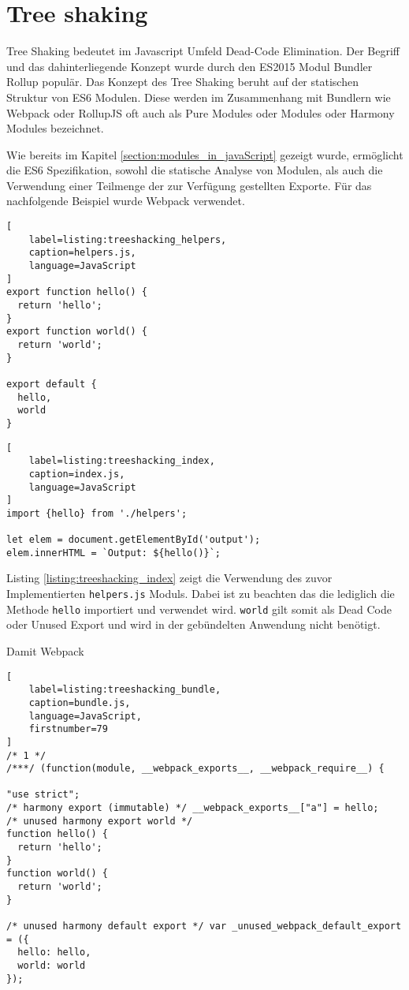 \section{Tree shaking}

Tree Shaking bedeutet im Javascript Umfeld Dead-Code Elimination. Der Begriff und das dahinterliegende Konzept wurde durch den ES2015 Modul Bundler Rollup populär. Das Konzept des Tree Shaking beruht auf der statischen Struktur von ES6 Modulen. Diese werden im Zusammenhang mit Bundlern wie Webpack oder RollupJS oft auch als Pure Modules oder Modules oder Harmony Modules bezeichnet. \autocite{WebpackTreeShaking}

Wie bereits im Kapitel \ref{section:modules_in_javaScript} gezeigt wurde, ermöglicht die ES6 Spezifikation, sowohl die statische Analyse von Modulen, als auch die Verwendung einer Teilmenge der zur Verfügung gestellten Exporte.
Für das nachfolgende Beispiel wurde Webpack verwendet.

\begin{lstlisting}[
    label=listing:treeshacking_helpers,
	caption=helpers.js,
	language=JavaScript
]
export function hello() {
  return 'hello';
}
export function world() {
  return 'world';
}

export default {
  hello,
  world
}
\end{lstlisting}

\begin{lstlisting}[
    label=listing:treeshacking_index,
	caption=index.js,
	language=JavaScript
]
import {hello} from './helpers';

let elem = document.getElementById('output');
elem.innerHTML = `Output: ${hello()}`;
\end{lstlisting}

Listing \ref{listing:treeshacking_index} zeigt die Verwendung des zuvor Implementierten \lstinline{helpers.js} Moduls. Dabei ist zu beachten das die lediglich die Methode \lstinline{hello} importiert und verwendet wird. \lstinline{world} gilt somit als Dead Code oder Unused Export und wird in der gebündelten Anwendung nicht benötigt.

Damit Webpack

\begin{lstlisting}[
    label=listing:treeshacking_bundle,
	caption=bundle.js,
	language=JavaScript,
    firstnumber=79
]
/* 1 */
/***/ (function(module, __webpack_exports__, __webpack_require__) {

"use strict";
/* harmony export (immutable) */ __webpack_exports__["a"] = hello;
/* unused harmony export world */
function hello() {
  return 'hello';
}
function world() {
  return 'world';
}

/* unused harmony default export */ var _unused_webpack_default_export = ({
  hello: hello,
  world: world
});
\end{lstlisting}

